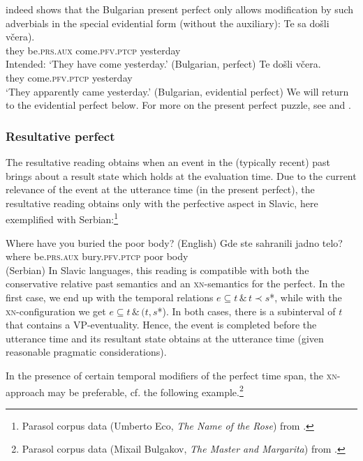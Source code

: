 \documentclass[output=paper,colorlinks,citecolor=brown]{langscibook}
\begin{document}
\citet[232]{Izvorski1997} indeed shows that the  Bulgarian present perfect only allows modification by such adverbials in the special evidential form (without the auxiliary):
\ea\ea\gll 
 Te sa došli  včera).\\ 
they be.\textsc{prs}.\textsc{aux} come.\textsc{pfv}.\textsc{ptcp} {} yesterday \\ 
\glt Intended: `They have come yesterday.' \hfill (Bulgarian, perfect) 
\ex\gll Te  došli včera. \\
they come.\textsc{pfv}.\textsc{ptcp}  yesterday \\
\glt `They apparently came yesterday.' \hfill (Bulgarian, evidential perfect) 
\z\z
 We will return to the evidential perfect below. For more on the present perfect puzzle, see  \citet{panchevastechow04} and \citet{gronn_stechow2020}.

 
\subsubsection{Resultative perfect}
\largerpage
The  resultative reading  obtains when an event in the (typically recent) past brings about a  result state which holds at the evaluation time. Due to the current relevance of the event at the utterance time (in the present perfect), the resultative reading obtains only with the perfective aspect in Slavic, here exemplified with Serbian:\footnote{Parasol corpus data (Umberto Eco, \textit{The Name of the Rose}) from \citet{gronn_stechow2020}.} 

\ea\ea\label{body}  Where have you buried the poor body? \hfill (English)
\ex\label{body-cr}\gll Gde ste sahranili jadno telo? \\
where be.\textsc{prs}.\textsc{aux} bury.\textsc{pfv}.\textsc{ptcp} poor body \\\hfill (Serbian) 
\z\z
In Slavic languages, this reading is compatible with both the conservative relative past semantics and an \textsc{xn}-semantics for the perfect. In the first case,  we end up with the temporal relations $e \subseteq t \, \& \, t \prec s$*, while with the \textsc{xn}-configuration we get $e \subseteq t \, \& \, $$ (t, s$*). In both cases, there is a subinterval of $t$ that contains a VP-eventuality. Hence,
the event is completed before the utterance time and its resultant state  obtains at the utterance time (given reasonable pragmatic considerations).

In the presence of certain temporal modifiers of the perfect time span, the \textsc{xn}-approach may be preferable, cf.  the following example.\footnote{Parasol corpus data (Mixail Bulgakov, \textit{The Master and Margarita}) from \citet{gronn_stechow2020}.}
\end{document}
